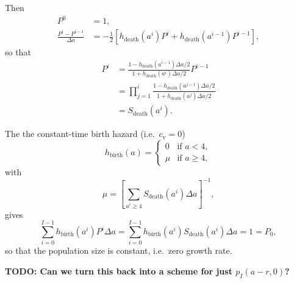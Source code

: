 \documentclass[12pt]{article}
\begin{document}
Then
\begin{subequations}
  \begin{align}
    P^0 &= 1,
    \\
    \frac{P^i - P^{i - 1}}{\Delta a}
    &= - \frac{1}{2}
    \left[h_{\text{death}}(a^i) P^i
      + h_{\text{death}}(a^{i - 1}) P^{i - 1}\right],
  \end{align}
\end{subequations}
so that
\begin{equation}
  \begin{split}
    P^i &=
    \frac{1 - h_{\text{death}}(a^{i - 1}) \Delta a / 2}
    {1 + h_{\text{death}}(a^i) \Delta a / 2} P^{i - 1}
    \\
    &=
    \prod_{j = 1}^i
    \frac{1 - h_{\text{death}}(a^{j - 1}) \Delta a / 2}
    {1 + h_{\text{death}}(a^j) \Delta a / 2}
    \\
    &= S_{\text{death}}(a^i).
  \end{split}
\end{equation}

The the constant-time birth hazard
(i.e.~$c_{\mathrm{v}} = 0$)
\begin{equation}
  h_{\text{birth}}(a) =
  \begin{cases}
    0 & \text{if $a < 4$}, \\
    \mu & \text{if $a \geq 4$},
  \end{cases}
\end{equation}
with
\begin{equation}
  \mu =
  \left[
    \sum_{a^i \geq 4}
    S_{\text{death}}(a^i)
    \Delta a
  \right]^{-1},
\end{equation}
gives
\begin{equation}
  \sum_{i = 0}^{I - 1}
  h_{\text{birth}}(a^i) P^i
  \Delta a
  = \sum_{i = 0}^{I - 1}
  h_{\text{birth}}(a^i) S_{\text{death}}(a^i)
  \Delta a
  = 1 = P_0,
\end{equation}
so that the population size is constant, i.e.~zero growth rate.

\textbf{TODO: Can we turn this back into a scheme for just $p_I(a - r, 0)$?}


\end{document}
